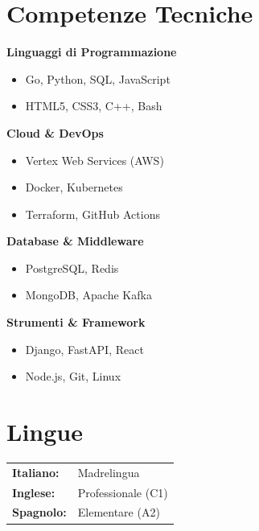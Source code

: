 \documentclass[10pt,a4paper]{article}
\begin{document}
\begin{minipage}[t]{0.33\textwidth}
  \section*{Competenze Tecniche}
  
  \textbf{Linguaggi di Programmazione}
  \begin{itemize}[leftmargin=*,noitemsep]
    \item Go, Python, SQL, JavaScript
    \item HTML5, CSS3, C++, Bash
  \end{itemize}
  
  \vspace{0.6em}
  \textbf{Cloud \& DevOps}
  \begin{itemize}[leftmargin=*,noitemsep]
    \item Vertex Web Services (AWS)
    \item Docker, Kubernetes
    \item Terraform, GitHub Actions
  \end{itemize}
  
  \vspace{0.6em}
  \textbf{Database \& Middleware}
  \begin{itemize}[leftmargin=*,noitemsep]
    \item PostgreSQL, Redis
    \item MongoDB, Apache Kafka
  \end{itemize}
  
  \vspace{0.6em}
  \textbf{Strumenti \& Framework}
  \begin{itemize}[leftmargin=*,noitemsep]
    \item Django, FastAPI, React
    \item Node.js, Git, Linux
  \end{itemize}

  \vspace{1.0em}

  \section*{Lingue}
  \begin{tabularx}{\textwidth}{l X}
    \textbf{Italiano:} & Madrelingua \\
    \textbf{Inglese:} & Professionale (C1) \\
    \textbf{Spagnolo:} & Elementare (A2) \\
  \end{tabularx}


\end{minipage}
\end{document}
